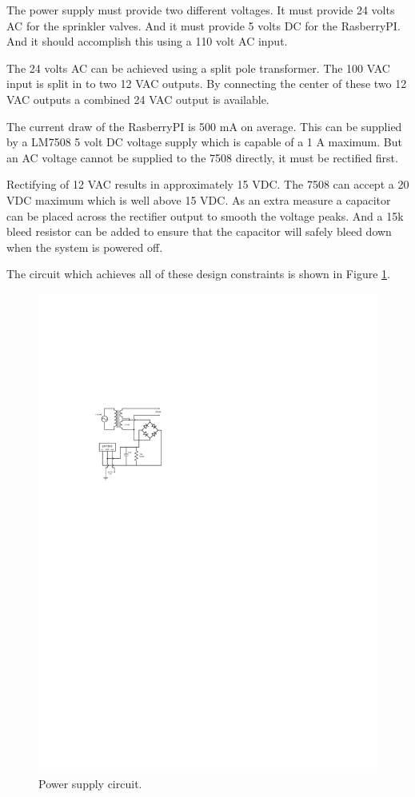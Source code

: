 \documentclass{article}
\begin{document}
The power supply must provide two different voltages.
It must provide 24 volts AC for the sprinkler valves.
And it must provide 5 volts DC for the RasberryPI.
And it should accomplish this using a 110 volt AC
input.

The 24 volts AC can be achieved using a split pole
transformer.
The 100 VAC input is split in to two 12 VAC outputs.
By connecting the center of these two 12 VAC outputs
a combined 24 VAC output is available.

The current draw of the RasberryPI is 500 mA on average.
This can be supplied by a LM7508 5 volt DC voltage supply
which is capable of a 1 A maximum.
But an AC voltage cannot be supplied to the 7508 directly,
it must be rectified first.

Rectifying of 12 VAC results in approximately 15 VDC.
The 7508 can accept a 20 VDC maximum which is well above 15 VDC.
As an extra measure a capacitor can be placed across the
rectifier output to smooth the voltage peaks.
And a 15k bleed resistor can be added to ensure that the capacitor
will safely bleed down when the system is powered off.

The circuit which achieves all of these design constraints is
shown in Figure \ref{fig:power}.

\begin{figure}[hbp]
\centering
\includegraphics[scale=2.0]{figs/power}
\caption{Power supply circuit.}\label{fig:power}
\end{figure}


\pagebreak
\printbibliography
\end{document}
